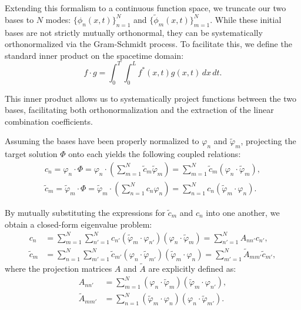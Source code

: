 Extending this formalism to a continuous function space, we truncate our two bases to \(N\) modes: \(\{ \phi_n(x,t) \}_{n=1}^N\) and \(\{ \tilde\phi_m(x,t) \}_{m=1}^N\). While these initial bases are not strictly mutually orthonormal, they can be systematically orthonormalized via the Gram-Schmidt process. To facilitate this, we define the standard inner product on the spacetime domain:
\begin{equation}
    f \cdot g = \int_0^T\int_0^L  f^*(x,t) g(x,t) \, dx \, dt.
\end{equation}

This inner product allows us to systematically project functions between the two bases, facilitating both orthonormalization and the extraction of the linear combination coefficients. 

Assuming the bases have been properly normalized to \(\varphi_n\) and \(\tilde\varphi_m\), projecting the target solution \(\Phi\) onto each yields the following coupled relations:
\begin{equation}\label{eq:coefficients_relation1}
\begin{aligned}
    c_n = \varphi_n \cdot \Phi = \varphi_n \cdot \left(\sum_{m=1}^N \tilde{c}_m \tilde{\varphi}_m\right) = \sum_{m=1}^N \tilde{c}_m (\varphi_n \cdot \tilde{\varphi}_m), \\
    \tilde{c}_m = \tilde{\varphi}_m \cdot \Phi = \tilde{\varphi}_m \cdot \left(\sum_{n=1}^N c_n \varphi_n\right) = \sum_{n=1}^N c_n (\tilde{\varphi}_m \cdot \varphi_n).
\end{aligned}
\end{equation}

By mutually substituting the expressions for \(\tilde{c}_m\) and \(c_n\) into one another, we obtain a closed-form eigenvalue problem:
\begin{equation}\label{eq:coefficients_relation2}
\begin{aligned}
    c_n &= \sum_{m=1}^N \sum_{n'=1}^N c_{n'} (\tilde{\varphi}_m \cdot \varphi_{n'}) (\varphi_n \cdot \tilde{\varphi}_m) = \sum_{n'=1}^N A_{nn'} c_{n'}, \\
    \tilde{c}_m &= \sum_{n=1}^N \sum_{m'=1}^N \tilde{c}_{m'} (\varphi_n \cdot \tilde{\varphi}_{m'}) (\tilde{\varphi}_m \cdot \varphi_n) = \sum_{m'=1}^N \tilde{A}_{mm'} \tilde{c}_{m'},
\end{aligned}
\end{equation}
where the projection matrices \(A\) and \(\tilde{A}\) are explicitly defined as:
\begin{equation}
\begin{aligned}
    A_{nn'} &= \sum_{m=1}^N (\varphi_n \cdot \tilde{\varphi}_m)(\tilde{\varphi}_m \cdot \varphi_{n'}), \\
    \tilde{A}_{mm'} &= \sum_{n=1}^N (\tilde{\varphi}_m \cdot \varphi_n)(\varphi_n \cdot \tilde{\varphi}_{m'}).
\end{aligned}
\end{equation}


